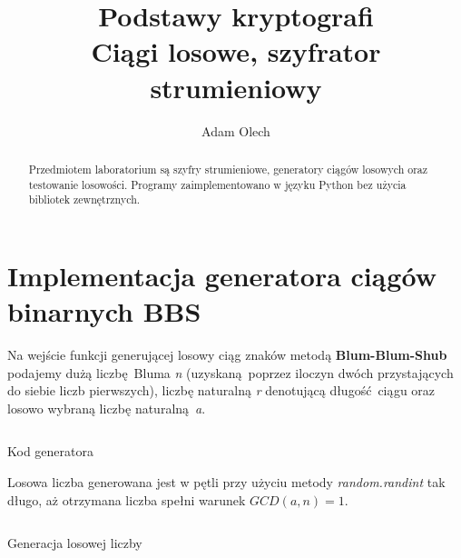 \documentclass[12pt]{article}
\title{Podstawy kryptografi \\ \large Ciągi losowe, szyfrator strumieniowy}
\author{Adam Olech}
\begin{document}
\maketitle

\begin{abstract}
Przedmiotem laboratorium są szyfry strumieniowe, generatory ciągów losowych oraz testowanie losowości.
Programy zaimplementowano w języku Python bez użycia bibliotek zewnętrznych.
\end{abstract}

\section{Implementacja generatora ciągów binarnych BBS}

Na wejście funkcji generującej losowy ciąg znaków metodą \textbf{Blum-Blum-Shub}
podajemy dużą liczbę Bluma \textit{n} 
(uzyskaną poprzez iloczyn dwóch przystających do siebie liczb pierwszych),
liczbę naturalną \textit{r} denotującą długość ciągu
oraz losowo wybraną liczbę naturalną \textit{a}.

\begin{listing}[H]
	\inputminted[firstline=21,lastline=32]{python}{../bbs_generator.py}
	\caption{Kod generatora}
\end{listing}

Losowa liczba  generowana jest w pętli przy użyciu metody \textit{random.randint}
tak długo, aż otrzymana liczba spełni warunek $GCD(a,n) = 1$.

\begin{listing}[H]
	\inputminted[firstline=14,lastline=19]{python}{../bbs_generator.py}
	\caption{Generacja losowej liczby}
\end{listing}
\end{document}
